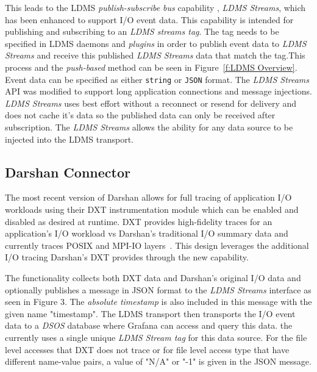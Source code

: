 This leads to the LDMS \emph{publish-subscribe bus} capability , \emph{LDMS Streams}, which has been enhanced to support I/O event data. This capability is intended for publishing and subscribing to an \emph{LDMS streams tag}. The tag needs to be specified in LDMS daemons and \emph{plugins} in order to publish event data to \emph{LDMS Streams} and receive this published \emph{LDMS Streams} data that match the tag.This process and the \emph{push-based} method can be seen in Figure~\ref{f:LDMS Overview}. Event data can be specified as either \texttt{string} or \texttt{JSON} format. The \emph{LDMS Streams} API was modified to support long application connections and message injections. \emph{LDMS Streams} uses best effort without a reconnect or resend for delivery and does not cache it's data so the published data can only be received after subscription. The \emph{LDMS Streams} allows the ability for any data source to be injected into the LDMS transport.

\subsection{Darshan Connector}

The most recent version of Darshan allows for full tracing of application I/O workloads using their DXT instrumentation module which can be enabled and disabled as desired at runtime. DXT provides high-fidelity traces for an application's I/O workload vs Darshan's traditional I/O summary data and currently traces POSIX and MPI-IO layers~\cite{darshan-runtime}. This design leverages the additional I/O tracing Darshan's DXT provides through the new \connector{} capability.


The \connector{} functionality collects both DXT data and Darshan's original I/O data and optionally publishes a message in JSON format to the \emph{LDMS Streams} interface as seen in Figure 3. The \emph{absolute timestamp} is also included in this message with the given name "timestamp". The LDMS transport then transports the I/O event data to a \emph{DSOS} database where Grafana can access and query this data. the \connector{} currently uses a single unique \emph{LDMS Stream tag} for this data source. For the file level accesses that DXT does not trace or for file level access type that have different name-value pairs, a value of "N/A" or "-1" is given in the JSON message. 

